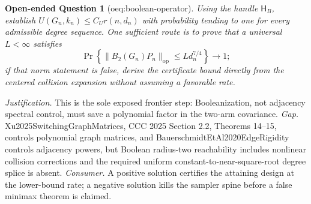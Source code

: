 \documentclass{article}
\newtheorem{openendedquestion}{Open-ended Question}
\begin{document}
\begin{openendedquestion}[oeq:boolean-operator]\label{oeq:boolean-operator}
Using the handle \(\mathsf H_B\), establish \(U(G_n,k_n)\le C_U r(n,d_n)\) with probability tending to one for every admissible degree sequence. One sufficient route is to prove that a universal \(L<\infty\) satisfies \[\Pr\!\left\{\|B_2(G_n)P_n\|_{\mathrm{op}}\le Ld_n^{7/4}\right\}\longrightarrow1;\] if that norm statement is false, derive the certificate bound directly from the centered collision expansion without assuming a favorable rate.
\end{openendedquestion}
\par\smallskip\noindent \textit{Justification.} This is the sole exposed frontier step: Booleanization, not adjacency spectral control, must save a polynomial factor in the two-arm covariance. \textit{Gap.} Xu2025SwitchingGraphMatrices, CCC 2025 Section 2.2, Theorems 14--15, controls polynomial graph matrices, and BauerschmidtEtAl2020EdgeRigidity controls adjacency powers, but Boolean radius-two reachability includes nonlinear collision corrections and the required uniform constant-to-near-square-root degree splice is absent. \textit{Consumer.} A positive solution certifies the attaining design at the lower-bound rate; a negative solution kills the sampler spine before a false minimax theorem is claimed.
\end{document}
